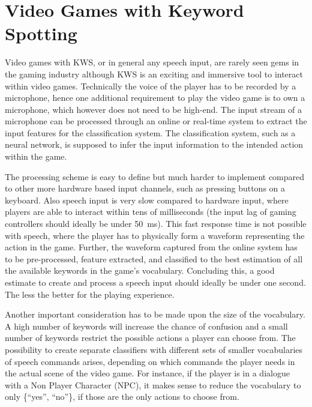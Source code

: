 
\section{Video Games with Keyword Spotting}\label{sec:intro_games}
Video games with KWS, or in general any speech input, are rarely seen gems in the gaming industry although KWS is an exciting and immersive tool to interact within video games.
Technically the voice of the player has to be recorded by a microphone, hence one additional requirement to play the video game is to own a microphone, which however does not need to be high-end.
The input stream of a microphone can be processed through an online or real-time system to extract the input features for the classification system.
The classification system, such as a neural network, is supposed to infer the input information to the intended action within the game.

The processing scheme is easy to define but much harder to implement compared to other more hardware based input channels, such as pressing buttons on a keyboard.
Also speech input is very slow compared to hardware input, where players are able to interact within tens of milliseconds (the input lag of gaming controllers should ideally be under \SI{50}{\milli\second}).
This fast response time is not possible with speech, where the player has to physically form a waveform representing the action in the game.
Further, the waveform captured from the online system has to be pre-processed, feature extracted, and classified to the best estimation of all the available keywords in the game's vocabulary.
Concluding this, a good estimate to create and process a speech input should ideally be under one second. 
The less the better for the playing experience.

Another important consideration has to be made upon the size of the vocabulary.
A high number of keywords will increase the chance of confusion and a small number of keywords restrict the possible actions a player can choose from.
The possibility to create separate classifiers with different sets of smaller vocabularies of speech commands arises, depending on which commands the player needs in the actual scene of the video game.
For instance, if the player is in a dialogue with a Non Player Character (NPC), it makes sense to reduce the vocabulary to only \{\enquote{yes}, \enquote{no}\}, if those are the only actions to choose from.

